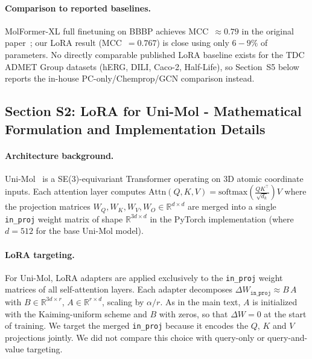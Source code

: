 \documentclass[9pt,a4paper]{article}
\begin{document}
\paragraph{Comparison to reported baselines.}
MolFormer-XL full finetuning on BBBP achieves MCC~$\approx 0.79$ in the original paper~\cite{ross2022molformer}; our LoRA result (MCC~$= 0.767$) is close using
only $6-9\%$ of parameters.
No directly comparable published LoRA baseline exists for the TDC ADMET Group datasets
(hERG, DILI, Caco-2, Half-Life), so Section~S5 below reports the in-house
PC-only/Chemprop/GCN comparison instead.

\subsection*{Section S2: LoRA for Uni-Mol - Mathematical Formulation and
Implementation Details}

\paragraph{Architecture background.}
Uni-Mol~\cite{zhou2023unimol} is a SE(3)-equivariant Transformer operating on
3D atomic coordinate inputs.
Each attention layer computes
$\text{Attn}(Q, K, V) = \text{softmax}\!\left(\tfrac{QK^\top}{\sqrt{d_k}}\right)V$
where the projection matrices $W_Q, W_K, W_V, W_O \in \mathbb{R}^{d \times d}$
are merged into a single \texttt{in\_proj} weight matrix of shape
$\mathbb{R}^{3d \times d}$ in the PyTorch implementation
(where $d = 512$ for the base Uni-Mol model).

\paragraph{LoRA targeting.}
For Uni-Mol, LoRA adapters are applied exclusively to the \texttt{in\_proj} weight
matrices of all self-attention layers.
Each adapter decomposes $\Delta W_{\texttt{in\_proj}} \approx B\,A$ with
$B \in \mathbb{R}^{3d \times r}$, $A \in \mathbb{R}^{r \times d}$, scaling by
$\alpha / r$. As in the main text, $A$ is initialized with the Kaiming-uniform scheme and $B$ with zeros, so that $\Delta W = 0$ at the start of training.
We target the merged \texttt{in\_proj} because it encodes the $Q$, $K$ and $V$ projections jointly. We did not compare this choice with query-only or query-and-value targeting.
\end{document}
